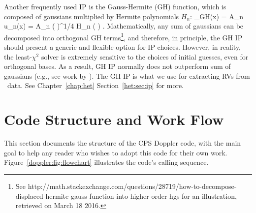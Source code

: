 Another frequently used IP is the Gauss-Hermite (GH)
function, which is composed of gaussians multiplied by Hermite
polynomials $H_n$:
\beq
\curlyp_{\rm GH}(x) = \sum A_n u_n(x) = \sum A_n 
\left(  \right)^{1/4}  H_n
\left(  \right) .
\eeq
Mathematically, any sum of gaussians can be decomposed into orthogonal
GH terms\footnote{See
  http://math.stackexchange.com/questions/28719/how-to-decompose-displaced-hermite-gauss-function-into-higher-order-hgs
  for an illustration, retrieved on March 18 2016.}, and therefore, in
principle, the GH IP should present a generic and flexible option for
IP choices. However, in reality, the least-$\chi^2$ solver is
extremely sensitive to the choices of initial guesses, even for
orthogonal bases. As a result, GH IP normally does not outperform sum
of gaussians (e.g., see work by \citealt{2013AAS...22114908V}). The GH
IP is what we use for extracting RVs from \het\ data. See
Chapter~\ref{chap:het} Section~\ref{het:sec:ip} for more.



\section{Code Structure and Work Flow}

This section documents the structure of the CPS Doppler code, with the
main goal to help any reader who wishes to adopt this code for their
own work. Figure~\ref{doppler:fig:flowchart} illustrates the code's
calling sequence. 


